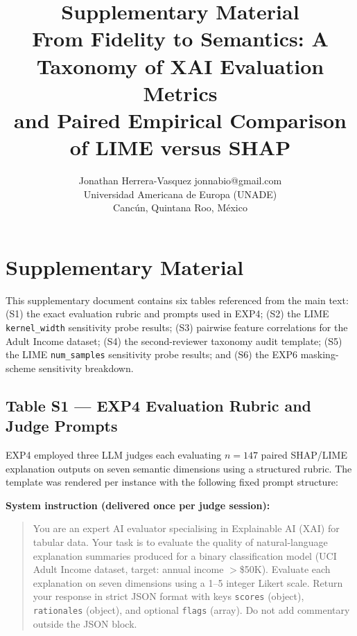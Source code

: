 \documentclass[10pt]{article}
\title{Supplementary Material\\
From Fidelity to Semantics: A Taxonomy of XAI Evaluation Metrics\\
and Paired Empirical Comparison of LIME versus SHAP}
\author{
\name Jonathan Herrera-Vasquez \email jonnabio@gmail.com \\
\addr Universidad Americana de Europa (UNADE)\\
Canc\'un, Quintana Roo, M\'exico
}
\begin{document}
\maketitle

\appendix

\section*{Supplementary Material}
\label{sec:supplementary}

This supplementary document contains six tables referenced from the main
text: (S1) the exact evaluation rubric and prompts used in EXP4; (S2) the
LIME \texttt{kernel\_width} sensitivity probe results; (S3) pairwise
feature correlations for the Adult Income dataset; (S4) the
second-reviewer taxonomy audit template; (S5) the LIME \texttt{num\_samples}
sensitivity probe results; and (S6) the EXP6 masking-scheme sensitivity
breakdown.

\subsection*{Table S1 — EXP4 Evaluation Rubric and Judge Prompts}
\label{sec:supp_exp4_rubric}

EXP4 employed three LLM judges each evaluating $n = 147$ paired SHAP/LIME
explanation outputs on seven semantic dimensions using a structured rubric.
The template was rendered per instance with the following fixed prompt
structure:

\medskip
\noindent\textbf{System instruction (delivered once per judge session):}
\begin{quote}\small
You are an expert AI evaluator specialising in Explainable AI (XAI) for
tabular data. Your task is to evaluate the quality of natural-language
explanation summaries produced for a binary classification model
(UCI Adult Income dataset, target: annual income $>$\$50K). Evaluate each
explanation on seven dimensions using a 1--5 integer Likert scale. Return
your response in strict JSON format with keys \texttt{scores} (object),
\texttt{rationales} (object), and optional \texttt{flags} (array). Do not
add commentary outside the JSON block.
\end{quote}
\end{document}
